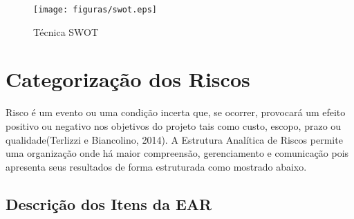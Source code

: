 \begin{figure}[!h]
 \centering
 \texttt{[image: figuras/swot.eps]}
 \caption{Técnica SWOT}
\end{figure}

\section{Categorização dos Riscos}
Risco é um evento ou uma condição incerta que, se ocorrer, provocará um efeito positivo ou negativo nos objetivos do projeto tais como custo, escopo, prazo ou qualidade(Terlizzi e Biancolino, 2014). A Estrutura Analítica de Riscos permite uma organização onde há maior compreensão, gerenciamento e comunicação pois apresenta seus resultados de forma estruturada como mostrado abaixo.
\subsection{Descrição dos Itens da EAR}
